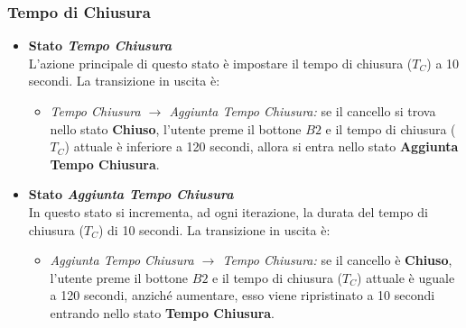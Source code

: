     \subsubsection{Tempo di Chiusura}
        \begin{itemize}
            \item \textbf{Stato \textit{Tempo Chiusura}} \\
                L'azione principale di questo stato è impostare il tempo di chiusura ($T_C$) a 10 secondi.
                \noindent La transizione in uscita è:
                \begin{itemize}
                    \item \textit{Tempo Chiusura $\rightarrow$ Aggiunta Tempo Chiusura:} se il cancello si trova nello stato \textbf{Chiuso}, l'utente preme il bottone $B2$ e il tempo di chiusura ($T_C$) attuale è inferiore a 120 secondi, allora si entra nello stato \textbf{Aggiunta Tempo Chiusura}.
                \end{itemize}

            \item \textbf{Stato \textit{Aggiunta Tempo Chiusura}} \\
                In questo stato si incrementa, ad ogni iterazione, la durata del tempo di chiusura ($T_C$) di 10 secondi.
                \noindent La transizione in uscita è:
                \begin{itemize}
                    \item \textit{Aggiunta Tempo Chiusura $\rightarrow$ Tempo Chiusura:} se il cancello è \textbf{Chiuso}, l'utente preme il bottone $B2$ e il tempo di chiusura ($T_C$) attuale è uguale a 120 secondi, anziché aumentare, esso viene ripristinato a 10 secondi entrando nello stato \textbf{Tempo Chiusura}.
                \end{itemize}
        \end{itemize}

